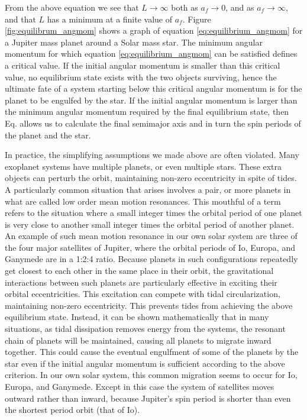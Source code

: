 From the above equation we see that $L \rightarrow \infty$ both as $a_f
\rightarrow 0$, and as $a_f \rightarrow \infty$, and that $L$ has a minimum
at a finite value of $a_f$. Figure \ref{fig:equilibrum_angmom} shows a graph of
equation \eqref{eq:equilibrium_angmom} for a Jupiter mass planet around a Solar
mass star. The minimum angular momentum for which equation
\eqref{eq:equilibrium_angmom} can be satisfied defines a critical value.  If the
initial angular momentum is smaller than this critical value, no equilibrium
state exists with the two objects surviving, hence the ultimate fate of a system
starting below this critical angular momentum is for the planet to be engulfed
by the star. If the initial angular momentum is larger than the minimum angular
momentum required by the final equilibrium state, then Eq.
\label{eq:equilibrium_angmom} allows us to calculate the final semimajor axis
and in turn the spin periods of the planet and the star.

In practice, the simplifying assumptions we made above are often violated. Many
exoplanet systems have multiple planets, or even multiple stars. These extra
objects can perturb the orbit, maintaining non-zero eccentricity in spite of
tides. A particularly common situation that arises involves a pair, or more
planets in what are called low order mean motion resonances. This mouthful of a
term refers to the situation where a small integer times the orbital period of
one planet is very close to another small integer times the orbital period of
another planet. An example of such mean motion resonance in our own solar system
are three of the four major satellites of Jupiter, where the orbital periods of
Io, Europa, and Ganymede are in a 1:2:4 ratio. Because planets in such
configurations repeatedly get closest to each other in the same place in their
orbit, the gravitational interactions between such planets are particularly
effective in exciting their orbital eccentricities. This excitation can compete
with tidal circularization, maintaining non-zero eccentricity. This prevents
tides from achieving the above equilibrium state. Instead, it can be shown
mathematically that in many situations, as tidal dissipation removes energy from
the systems, the resonant chain of planets will be maintained, causing all
planets to migrate inward together. This could cause the eventual engulfment of
some of the planets by the star even if the initial angular momentum is
sufficient according to the above criterion. In our own solar system, this
common migration seems to occur for Io, Europa, and Ganymede. Except in this
case the system of satellites moves outward rather than inward, because
Jupiter's spin period is shorter than even the shortest period orbit (that of
Io).

